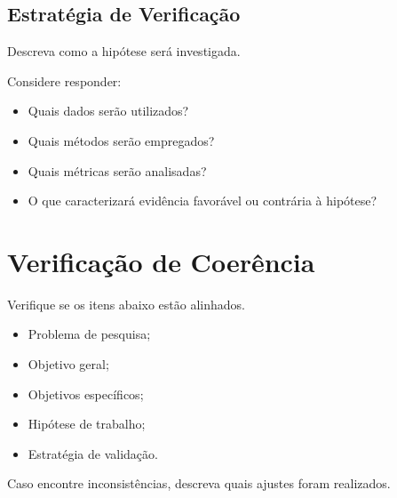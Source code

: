 \documentclass[10pt,a4paper]{extarticle}
\begin{document}
\subsection{Estratégia de Verificação}

\begin{respbox}

Descreva como a hipótese será investigada.

Considere responder:

\begin{itemize}
    \item Quais dados serão utilizados?
    \item Quais métodos serão empregados?
    \item Quais métricas serão analisadas?
    \item O que caracterizará evidência favorável ou contrária à hipótese?
\end{itemize}

\end{respbox}


\section{Verificação de Coerência}

\begin{respbox}

Verifique se os itens abaixo estão alinhados.

\begin{itemize}
\item[$\square$] Problema de pesquisa;
\item[$\square$] Objetivo geral;
\item[$\square$] Objetivos específicos;
\item[$\square$] Hipótese de trabalho;
\item[$\square$] Estratégia de validação.
\end{itemize}

Caso encontre inconsistências, descreva quais ajustes foram realizados.

\end{respbox}
\end{document}
